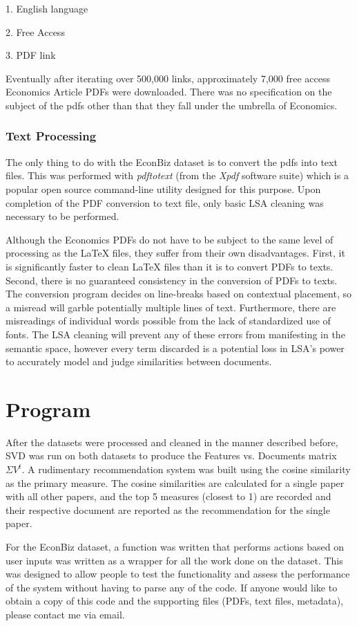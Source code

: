 \documentclass [12pt]{article}
\begin{document}
1. English language

2. Free Access

3. PDF link

Eventually after iterating over 500,000 links, approximately 7,000 free access Economics Article PDFs were downloaded. There was no specification on the subject of the pdfs other than that they fall under the umbrella of Economics. 

\subsubsection{Text Processing}
The only thing to do with the EconBiz dataset is to convert the pdfs into text files. This was performed with \emph{pdftotext} (from the \emph{Xpdf} software suite) which is a popular open source command-line utility designed for this purpose. Upon completion of the PDF conversion to text file, only basic LSA cleaning was necessary to be performed. 

Although the Economics PDFs do not have to be subject to the same level of processing as the LaTeX files, they suffer from their own disadvantages. First, it is significantly faster to clean LaTeX files than it is to convert PDFs to texts. Second, there is no guaranteed consistency in the conversion of PDFs to texts. The conversion program decides on line-breaks based on contextual placement, so a misread will garble potentially multiple lines of text. Furthermore, there are misreadings of individual words possible from the lack of standardized use of fonts. The LSA cleaning will prevent any of these errors from manifesting in the semantic space, however every term discarded is a potential loss in LSA's power to accurately model and judge similarities between documents. 


\section{Program}

After the datasets were processed and cleaned in the manner described before, SVD was run on both datasets to produce the Features vs. Documents matrix $\Sigma V^t$. A rudimentary recommendation system was built using the cosine similarity as the primary measure. The cosine similarities are calculated for a single paper with all other papers, and the top 5 measures (closest to 1) are recorded and their respective document are reported as the recommendation for the single paper. 

For the EconBiz dataset, a function was written that performs actions based on user inputs was written as a wrapper for all the work done on the dataset. This was designed to allow people to test the functionality and assess the performance of the system without having to parse any of the code. If anyone would like to obtain a copy of this code  and the supporting files (PDFs, text files, metadata), please contact me via email.
\end{document}
